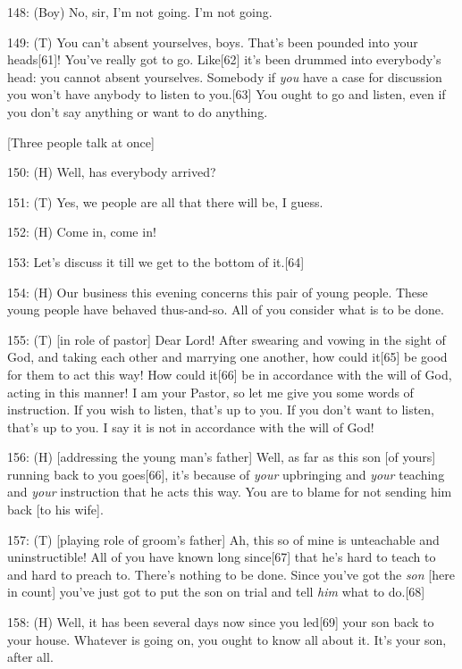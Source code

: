 148: (Boy) No, sir, I'm not going. I'm not going.

149: (T) You can't absent yourselves, boys. That's been pounded into your heads[61]!
You've really got to go. Like[62] it's been drummed into everybody's head: you
cannot absent yourselves. Somebody if \textit{you} have a case for discussion you
won't have anybody to listen to you.[63] You ought to go and listen, even if you
don't say anything or want to do anything.

\begin{center}
[Three people talk at once]
\end{center}

\leftskip=0pt
150: (H) Well, has everybody arrived?

151: (T) Yes, we people are all that there will be, I guess.

152: (H) Come in, come in!

153: Let's discuss it till we get to the bottom of it.[64]

154: (H) Our business this evening concerns this pair of young people. These young
people have behaved thus-and-so. All of you consider what is to be done.

155: (T) [in role of pastor] Dear Lord! After swearing and vowing in the sight
of God, and taking each other and marrying one another, how could it[65] be good
for them to act this way! How could it[66] be in accordance with the will of God,
acting in this manner! I am your Pastor, so let me give you some words of instruction.
If you wish to listen, that's up to you. If you don't want to listen, that's up
to you. I say it is not in accordance with the will of God!

156: (H) [addressing the young man's father] Well, as far as this son [of yours]
running back to you goes[66], it's because of \textit{your} upbringing and \textit{your}
teaching and \textit{your} instruction that he acts this way. You are to blame
for not sending him back [to his wife].

157: (T) [playing role of groom's father] Ah, this so of mine is unteachable and
uninstructible! All of you have known long since[67] that he's hard to teach to
and hard to preach to. There's nothing to be done. Since you've got the \textit{son
}[here in count] you've just got to put the son on trial and tell \textit{him}
what to do.[68]

158: (H) Well, it has been several days now since you led[69] your son back to
your house. Whatever is going on, you ought to know all about it. It's your son,
after all.

